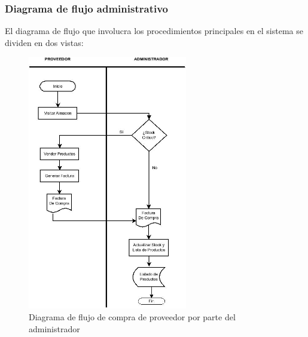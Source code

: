 \documentclass[letterpaper,12pt]{article}
\begin{document}
\newpage

\subsubsection{Diagrama de flujo administrativo}

El diagrama de flujo que involucra los procedimientos principales en el sistema se dividen en dos vistas:

\mbox{}
\vspace*{1cm} 
\begin{figure}[!ht]
\begin{center}
\includegraphics[width =0.62\textwidth]{images/flujoadm_proveedor_administrador.jpeg}
\end{center}
\caption{Diagrama de flujo de compra de proveedor por parte del administrador}
\end{figure}
\end{document}
